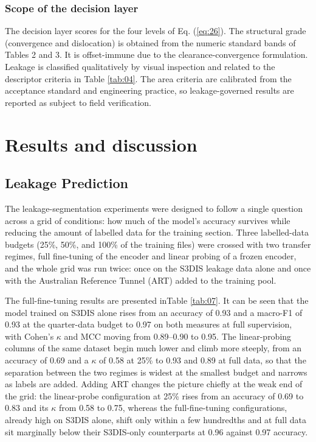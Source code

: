 \documentclass[preprint,12pt,authoryear]{elsarticle}
\begin{document}
\subsubsection{Scope of the decision
layer}\label{scope-of-the-decision-layer}

The decision layer scores for the four levels of Eq. (\ref{eq:26}). The structural
grade (convergence and dislocation) is obtained from the numeric
standard bands of Tables 2 and 3. It is offset-immune due to the
clearance-convergence formulation. Leakage is classified qualitatively
by visual inspection and related to the descriptor criteria in Table \ref{tab:04}.
The area criteria are calibrated from the acceptance standard and
engineering practice, so leakage-governed results are reported as
subject to field verification.

\section{Results and discussion}\label{results-and-discussion}

\subsection{Leakage Prediction}\label{leakage-prediction-1}

The leakage-segmentation experiments were designed to follow a single
question across a grid of conditions: how much of the model's accuracy
survives while reducing the amount of labelled data for the training
section. Three labelled-data budgets (25\%, 50\%, and 100\% of the
training files) were crossed with two transfer regimes, full fine-tuning
of the encoder and linear probing of a frozen encoder, and the whole
grid was run twice: once on the S3DIS leakage data alone and once with
the Australian Reference Tunnel (ART) added to the training pool.

The full-fine-tuning results are presented inTable \ref{tab:07}. It can be
seen that the model trained on S3DIS alone rises from an accuracy of
0.93 and a macro-F1 of 0.93 at the quarter-data budget to 0.97 on both
measures at full supervision, with Cohen's $\kappa$ and MCC moving from
0.89--0.90 to 0.95. The linear-probing columns of the same dataset begin
much lower and climb more steeply, from an accuracy of 0.69 and a $\kappa$ of
0.58 at 25\% to 0.93 and 0.89 at full data, so that the separation
between the two regimes is widest at the smallest budget and narrows as
labels are added. Adding ART changes the picture chiefly at the weak end
of the grid: the linear-probe configuration at 25\% rises from an
accuracy of 0.69 to 0.83 and its $\kappa$ from 0.58 to 0.75, whereas the
full-fine-tuning configurations, already high on S3DIS alone, shift only
within a few hundredths and at full data sit marginally below their
S3DIS-only counterparts at 0.96 against 0.97 accuracy.
\end{document}
